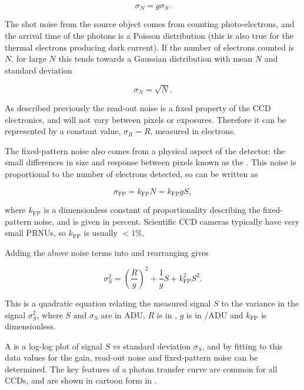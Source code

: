\begin{colsection}
\begin{colsection}
\begin{equation}
    \sigma_N = g \sigma_S.
    \label{eq:noise_gain}
\end{equation}

The shot noise from the source object comes from counting photo-electrons, and the arrival time of the photons is a Poisson distribution (this is also true for the thermal electrons producing dark current). If the number of electrons counted is $N$, for large $N$ this tends towards a Gaussian distribution with mean $N$ and standard deviation

\begin{equation}
    \sigma_N = \sqrt{N}.
    \label{eq:shot_noise}
\end{equation}

As described previously the read-out noise is a fixed property of the CCD electronics, and will not vary between pixels or exposures. Therefore it can be represented by a constant value, $\sigma_R = R$, measured in electrons.

The fixed-pattern noise also comes from a physical aspect of the detector: the small differences in size and response between pixels known as the . This noise is proportional to the number of electrons detected, so can be written as

\begin{equation}
    \sigma_\text{FP} = k_\text{FP}N = k_\text{FP}gS,
    \label{eq:fp_noise}
\end{equation}

where $k_\text{FP}$ is a dimensionless constant of proportionality describing the fixed-pattern noise, and is given in percent. Scientific CCD cameras typically have very small PRNUs, so $k_\text{FP}$ is usually $<1\%$.

Adding the above noise terms into  and rearranging gives

\begin{equation}
    \sigma_S^2 = {\left(\frac{R}{g}\right)}^2 +
                 \frac{1}{g}S +
                 k_\text{FP}^2 S^2.
    \label{eq:ptc}
\end{equation}

This is a quadratic equation relating the measured signal $S$ to the variance in the signal $\sigma_S^2$, where $S$ and $\sigma_S$ are in ADU, $R$ is in \elec, $g$ is in \elec/ADU and $k_\text{FP}$ is dimensionless.

A  is a log-log plot of signal $S$ vs standard deviation $\sigma_S$, and by fitting  to this data values for the gain, read-out noise and fixed-pattern noise can be determined. The key features of a photon transfer curve are common for all CCDs, and are shown in cartoon form in .


\end{colsection}
\end{colsection}
